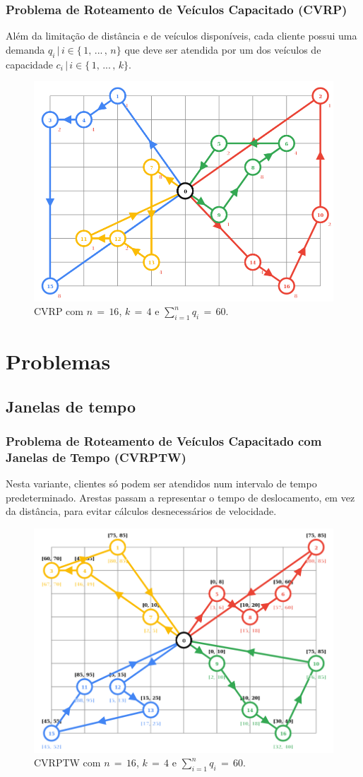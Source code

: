 \documentclass{beamer}
\begin{document}
\begin{frame} %
    \frametitle{Problema de Roteamento de Veículos Capacitado (CVRP)}

    Além da limitação de distância e de veículos disponíveis, cada cliente possui uma demanda \(q_{i} \, | \, i \in \{ \, 1, \, ... \, , \, n\} \) que deve ser atendida por um dos veículos de capacidade \(c_{i} \, | \, i \in \{ \, 1, \, ... \, , \, k\} \).

    \begin{figure}
        \includegraphics[width=0.56\linewidth]{cvrp.png}
        \caption{CVRP com \(n \, = \, 16\), \(k \, = \, 4\) e \(\sum_{i=1}^{n} q_{i} \, = \, 60\).}
    \end{figure}

\end{frame}

\section{Problemas}

\subsection{Janelas de tempo}

\begin{frame} %
    \frametitle{Problema de Roteamento de Veículos Capacitado com Janelas de Tempo (CVRPTW)}

    Nesta variante, clientes só podem ser atendidos num intervalo de tempo predeterminado. Arestas passam a representar o tempo de deslocamento, em vez da distância, para evitar cálculos desnecessários de velocidade. 

    \begin{figure}
        \includegraphics[width=0.48\linewidth]{cvrptw.png}
        \caption{CVRPTW com \(n \, = \, 16\), \(k \, = \, 4\) e \(\sum_{i=1}^{n} q_{i} \, = \, 60\).}
    \end{figure}

\end{frame}
\end{document}

